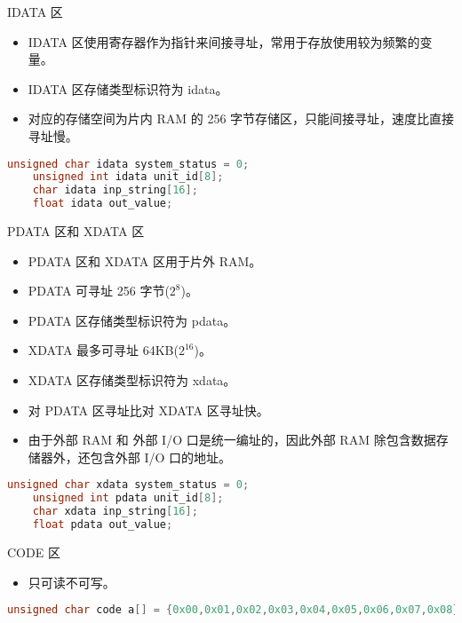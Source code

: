 \documentclass{beamer}
\begin{document}
\begin{frame}[fragile]{IDATA 区}
    \begin{itemize}
        \item
            IDATA 区使用寄存器作为指针来间接寻址，常用于存放使用较为频繁的变量。
        \item
            IDATA 区存储类型标识符为 idata。
        \item
            对应的存储空间为片内 RAM 的 256
            字节存储区，只能间接寻址，速度比直接寻址慢。
    \end{itemize}

    \begin{lstlisting}[language=C]
    unsigned char idata system_status = 0;
    unsigned int idata unit_id[8];
    char idata inp_string[16];
    float idata out_value;
    \end{lstlisting}
\end{frame}

\begin{frame}[fragile]{PDATA 区和 XDATA 区}
    \begin{itemize}
        \item
            PDATA 区和 XDATA 区用于片外 RAM。
        \item
            PDATA 可寻址 256 字节(\(2^8\))。
        \item
            PDATA 区存储类型标识符为 pdata。
        \item
            XDATA 最多可寻址 64KB(\(2^{16}\))。
        \item
            XDATA 区存储类型标识符为 xdata。
        \item
            对 PDATA 区寻址比对 XDATA 区寻址快。
        \item
            由于外部 RAM 和 外部 I/O 口是统一编址的，因此外部 RAM
            除包含数据存储器外，还包含外部 I/O 口的地址。
    \end{itemize}

    \begin{lstlisting}[language=C]
    unsigned char xdata system_status = 0;
    unsigned int pdata unit_id[8];
    char xdata inp_string[16];
    float pdata out_value;
    \end{lstlisting}
\end{frame}

\begin{frame}[fragile]{CODE 区}
    \begin{itemize}
        \item
            只可读不可写。
    \end{itemize}

    \begin{lstlisting}[language=C]
    unsigned char code a[] = {0x00,0x01,0x02,0x03,0x04,0x05,0x06,0x07,0x08};
    \end{lstlisting}
\end{frame}
\end{document}
